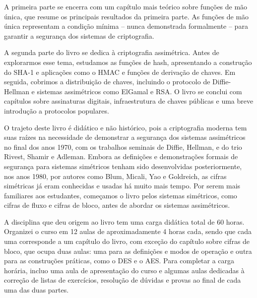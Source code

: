 A primeira parte se encerra com um capítulo mais teórico sobre funções de mão única, que resume os principais resultados da primeira parte.
As funções de mão única representam a condição mínima -- nunca demonstrada formalmente -- para garantir a segurança dos sistemas de criptografia.

A segunda parte do livro se dedica à criptografia assimétrica.
Antes de explorarmos esse tema, estudamos as funções de hash, apresentando a construção do SHA-1 e aplicações como o HMAC e funções de derivação de chaves.
Em seguida, cobrimos a distribuição de chaves, incluindo o protocolo de Diffie-Hellman e sistemas assimétricos como ElGamal e RSA.
O livro se conclui com capítulos sobre assinaturas digitais, infraestrutura de chaves públicas e uma breve introdução a protocolos populares.

O trajeto deste livro é didático e não histórico, pois a criptografia moderna tem suas raízes na necessidade de demonstrar a segurança dos sistemas assimétricos no final dos anos 1970, com os trabalhos seminais de Diffie, Hellman, e do trio Rivest, Shamir e Adleman.
Embora as definições e demonstrações formais de segurança para sistemas simétricos tenham sido desenvolvidas posteriormente, nos anos 1980, por autores como Blum, Micali, Yao e Goldreich, as cifras simétricas já eram conhecidas e usadas há muito mais tempo.
Por serem mais familiares aos estudantes, começamos o livro pelos sistemas simétricos, como cifras de fluxo e cifras de bloco, antes de abordar os sistemas assimétricos.

A disciplina que deu origem ao livro tem uma carga didática total de 60 horas.
Organizei o curso em 12 aulas de aproximadamente 4 horas cada, sendo que cada uma corresponde a um capítulo do livro, com exceção do capítulo sobre cifras de bloco, que ocupa duas aulas:
uma para as definições e modos de operação e outra para as construções práticas, como o DES e o AES.
Para completar a carga horária, incluo uma aula de apresentação do curso e algumas aulas dedicadas à correção de listas de exercícios, resolução de dúvidas e provas ao final de cada uma das duas partes.



